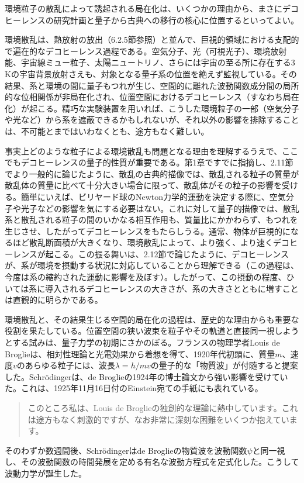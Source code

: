 \hypertarget{srcpage:115}{}\label{srcpage:115}
環境粒子の散乱によって誘起される局在化は、いくつかの理由から、まさにデコヒーレンスの研究計画と量子から古典への移行の核心に位置するといってよい。

環境散乱は、熱放射の放出（6.2.5節参照）と並んで、巨視的領域における支配的で遍在的なデコヒーレンス過程である。空気分子、光（可視光子）、環境放射能、宇宙線ミュー粒子、太陽ニュートリノ、さらには宇宙の至る所に存在する3\,Kの宇宙背景放射さえも、対象となる量子系の位置を絶えず監視している。その結果、系と環境の間に量子もつれが生じ、空間的に離れた波動関数成分間の局所的な位相関係が非局在化され、位置空間におけるデコヒーレンス（すなわち局在化）が起こる。精巧な実験装置を用いれば、こうした環境粒子の一部（空気分子や光など）から系を遮蔽できるかもしれないが、それ以外の影響を排除することは、不可能とまではいわなくとも、途方もなく難しい。

事実上どのような粒子による環境散乱も問題となる理由を理解するうえで、ここでもデコヒーレンスの量子的性質が重要である。第1章ですでに指摘し、2.11節でより一般的に論じたように、散乱の古典的描像では、散乱される粒子の質量が散乱体の質量に比べて十分大きい場合に限って、散乱体がその粒子の影響を受ける。簡単にいえば、ビリヤード球のNewton力学的運動を決定する際に、空気分子や光子などの影響を気にする必要はない。これに対して量子的描像では、散乱系と散乱される粒子の間のいかなる相互作用も、質量比にかかわらず、もつれを生じさせ、したがってデコヒーレンスをもたらしうる。通常、物体が巨視的になるほど散乱断面積が大きくなり、環境散乱によって、より強く、より速くデコヒーレンスが起こる。この振る舞いは、2.12節で論じたように、デコヒーレンスが、系が環境を摂動する状況に対応していることから理解できる（この過程は、今度は系の縮約された運動に影響を及ぼす）。したがって、この摂動の程度、ひいては系に導入されるデコヒーレンスの大きさが、系の大きさとともに増すことは直観的に明らかである。

\hypertarget{srcpage:116}{}\label{srcpage:116}
環境散乱と、その結果生じる空間的局在化の過程は、歴史的な理由からも重要な役割を果たしている。位置空間の狭い波束を粒子やその軌道と直接同一視しようとする試みは、量子力学の初期にさかのぼる。フランスの物理学者Louis de Broglieは、相対性理論と光電効果から着想を得て、1920年代初頭に、質量$m$、速度$v$のあらゆる粒子には、波長$\lambda=h/mv$の量子的な「物質波」が付随すると提案した\cite{ref034,ref153,ref154,ref155}。Schrödingerは、de Broglieの1924年の博士論文\cite{ref156}から強い影響を受けていた。これは、1925年11月16日付のEinstein宛ての手紙にも表れている。
\begin{quote}
このところ私は、Louis de Broglieの独創的な理論に熱中しています。これは途方もなく刺激的ですが、なお非常に深刻な困難をいくつか抱えています。
\end{quote}
そのわずか数週間後、Schrödingerはde Broglieの物質波を波動関数$\psi$と同一視し、その波動関数の時間発展を定める有名な波動方程式を定式化した。こうして波動力学が誕生した。

